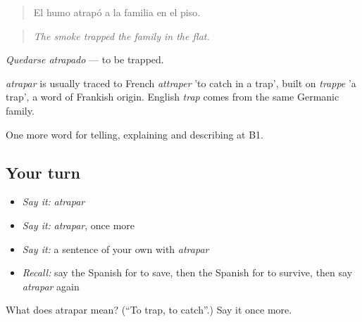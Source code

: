 \begin{quote}
El humo atrapó a la familia en el piso.
\end{quote}

\begin{quote}
\emph{The smoke trapped the family in the flat.}
\end{quote}

\emph{Quedarse atrapado} — to be trapped.

\begin{cousinweb}
\emph{atrapar} is usually traced to French \emph{attraper} 'to catch in a trap', built on \emph{trappe} 'a trap', a word of Frankish origin. English \emph{trap} comes from the same Germanic family.
\end{cousinweb}

\begin{grammarlens}[title={What you've built}]
One more word for telling, explaining and describing at B1.
\end{grammarlens}

\subsection*{Your turn}
\begin{itemize}
\raggedright
  \item \emph{Say it:} \emph{atrapar}
  \item \emph{Say it:} \emph{atrapar}, once more
  \item \emph{Say it:} a sentence of your own with \emph{atrapar}
  \item \emph{Recall:} say the Spanish for to save, then the Spanish for to survive, then say \emph{atrapar} again
\end{itemize}

\begin{tcolorbox}[breakable,colback=teal!4,colframe=teal!35!black,title={Before you move on}]
What does atrapar mean? (\textquotedblleft{}To trap, to catch\textquotedblright{}.) Say it once more.
\end{tcolorbox}
